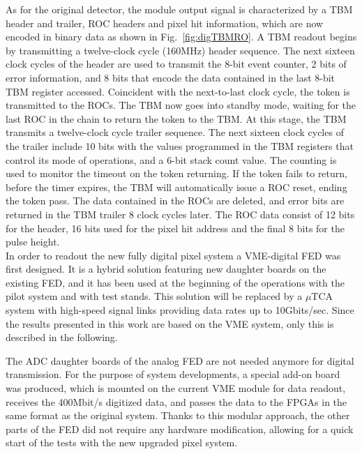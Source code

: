 As for the original detector, the module output signal is characterized by a TBM header and trailer, ROC headers and pixel hit information, which are now encoded in binary data as shown in Fig.~\ref{fig:digTBMRO}.
A TBM readout begins by transmitting a twelve-clock cycle (160\unit{MHz}) header sequence.
The next sixteen clock cycles of the header are used to transmit the 8-bit event counter, 2 bits of error information, and 8 bits that encode the data contained in the last 8-bit TBM register accessed.
Coincident with the next-to-last clock cycle, the token is transmitted to the ROCs. The TBM now goes into standby mode, waiting for the last ROC in the chain to return the token to the TBM.
At this stage, the TBM transmits a twelve-clock cycle trailer sequence.
The next sixteen clock cycles of the trailer include 10 bits with the values programmed in the TBM registers that control its mode of operations, and a 6-bit stack count value.
The counting is used to monitor the timeout on the token returning. If the token fails to return, before the timer expires, the TBM will automatically issue a ROC reset, ending the token pass.
The data contained in the ROCs are deleted, and error bits are returned in the TBM trailer 8 clock cycles later.
The ROC data consist of 12 bits for the header, 16 bits used for the pixel hit address and the final 8 bits for the pulse height.\\

In order to readout the new fully digital pixel system a VME-digital FED was first designed.
It is a hybrid solution featuring new daughter boards on the existing FED, and it has been used at the beginning of the operations with the pilot system and with test stands.
This solution will be replaced by a $\mu$TCA system with high-speed signal links providing data rates up to 10\unit{Gbits/sec}. 
Since the results presented in this work are based on the VME system, only this is described in the following.

The ADC daughter boards of the analog FED are not needed anymore for digital transmission.
For the purpose of system developments, a special add-on board was produced, which is mounted on the current VME module for data readout, receives the 400\unit{Mbit/s} digitized data, and passes the data to the FPGAs in the same format as the original system.
Thanks to this modular approach, the other parts of the FED did not require any hardware modification, allowing for a quick start of the tests with the new upgraded pixel system.

